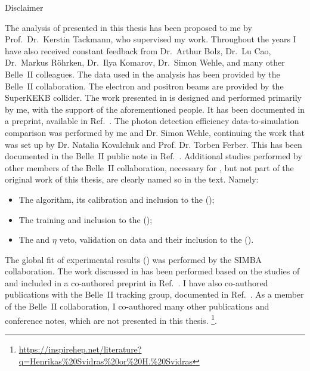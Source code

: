     \begin{abstractpage}{Disclaimer}
    
        The analysis of \BtoXsgamma presented in this thesis has been proposed to me by Prof.~Dr.~Kerstin Tackmann, 
        who supervised my work.
        Throughout the years I have also received constant feedback from Dr.~Arthur Bolz, Dr.~Lu Cao, Dr.~Markus R\"ohrken, Dr.~Ilya Komarov,
        Dr.~Simon Wehle, and many other Belle~II colleagues.
        The data used in the analysis has been provided by the Belle~II collaboration.
        The electron and positron beams are provided by the SuperKEKB collider.
        The work presented in  is designed and performed primarily by me, with the support of the aforementioned people.
        It has been documented in a preprint, available in Ref.~\cite{Belle-II:2022hys}.
        The photon detection efficiency data-to-simulation comparison was performed by me and Dr. Simon Wehle, continuing the work that was set up by Dr. Natalia Kovalchuk and Prof. Dr. Torben Ferber.
        This has been documented in the Belle~II public note in Ref.~\cite{Henrikas:2604}.
        Additional studies performed by other members of the Belle~II collaboration, necessary for \BtoXsgamma, but not part of the original work of this thesis,
        are clearly named so in the text. Namely:
        \begin{itemize}
            \item The \FEI algorithm, its calibration and inclusion to the \basftwo ();
            \item The \ZMVA training and inclusion to the \basftwo  ();
            \item The \piz and $\eta$ veto, validation on data and their inclusion to the \basftwo ().
        \end{itemize}
        The global fit of \BtoXsgamma experimental results () was performed by the SIMBA collaboration.
        The work discussed in  has been performed based on the studies of  and included in a co-authored preprint in Ref.~\cite{Belle-II:2022cgf}.
        I have also co-authored publications with the Belle~II tracking group, documented in Ref.~\cite{BelleIITrackingGroup:2020hpx}.
        As a member of the Belle~II collaboration, I co-authored many other publications and conference notes, which are not presented in this thesis.
        \footnote{{\scriptsize\url{https://inspirehep.net/literature?q=Henrikas\%20Svidras\%20or\%20H.\%20Svidras}}}.
        

\end{abstractpage}
